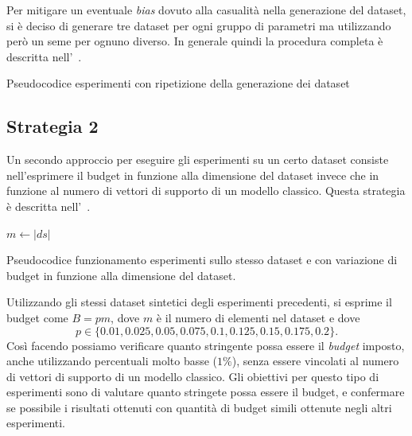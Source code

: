 Per mitigare un eventuale \emph{bias} dovuto alla casualità nella generazione del dataset, si è deciso di generare tre dataset per ogni gruppo di parametri ma utilizzando però un seme per ognuno diverso.
In generale quindi la procedura completa è descritta nell'~.
\begin{algorithm}
    \SetAlgoLined
\caption{Pseudocodice esperimenti con ripetizione della generazione dei dataset}
\label{alg:esperimenti_2}
\end{algorithm}

\subsection{Strategia 2}
Un secondo approccio per eseguire gli esperimenti su un certo dataset consiste nell'esprimere il budget in funzione alla dimensione del dataset invece che in funzione al numero di vettori di supporto di un modello classico.
Questa strategia è descritta nell'~.
\begin{algorithm}
    \SetAlgoLined
    $m \gets |ds|$
\caption{Pseudocodice funzionamento esperimenti sullo stesso dataset e con variazione di budget in funzione alla dimensione del dataset.}
\label{alg:esperimenti_3}
\end{algorithm}

Utilizzando gli stessi dataset sintetici degli esperimenti precedenti, si esprime il budget come $B=pm$, dove $m$ è il numero di elementi nel dataset e dove
\begin{equation*}
    p\in\{0.01, 0.025, 0.05, 0.075, 0.1, 0.125, 0.15, 0.175, 0.2\}.
\end{equation*}
Così facendo possiamo verificare quanto stringente possa essere il \emph{budget} imposto, anche utilizzando percentuali molto basse ($1\%$), senza essere vincolati al numero di vettori di supporto di un modello classico.
Gli obiettivi per questo tipo di esperimenti sono di valutare quanto stringete possa essere il budget, e confermare se possibile i risultati ottenuti con quantità di budget simili ottenute negli altri esperimenti.

